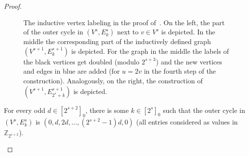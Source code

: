 \documentclass[unicode,runningheads,envcountsame,a4paper,dvipsnames,12pt]{llncs}
\newcommand{\Z}{\mathbb{Z}}
\begin{document}
\begin{proof}
\begin{figure}[t]
			\caption{The inductive vertex labeling in the proof of~. On the left, the part of the outer cycle in \((V^s,E_k^s)\) next to \(v \in V^s\) is depicted.  In the middle the corresponding part of the inductively defined graph \((V^{s+1},E_k^{s+1})\) is depicted. For the graph in the middle the labels of the black vertices get doubled (modulo \(2^{s+3}\)) and the new vertices and edges in blue are added (for \(u=2v\) in the fourth step of the construction). Analogously, on the right, the construction of \((V^{s+1},E_{2^s+k}^{s+1})\) is depicted.}
			\label{fig:labeling-induction-step}
		\end{figure}
		
		\begin{claim}
			For every odd \(d \in [2^{s+2}]_0\), there is some \(k \in [2^s]_0\) such that the outer cycle in~\((V^s,E_k^s)\) is \((0,d,2d,\dots,(2^{s+2}-1)d,0)\) (all entries considered as values in \(\Z_{2^{s+2}}\)).
			\label{claim:odd}
		\end{claim}
		

\end{proof}
\end{document}
